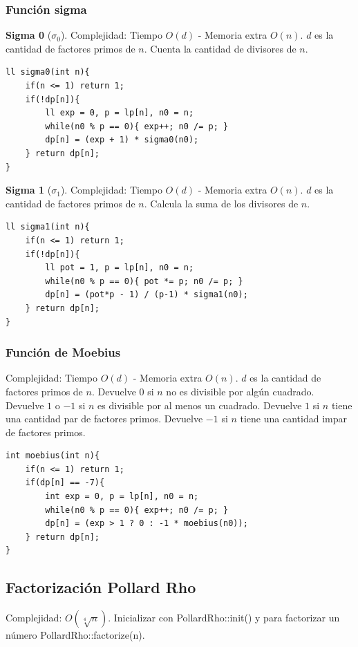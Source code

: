 \documentclass[12 pts,spanish,mexico]{article}
\numberwithin{equation}{section}
\begin{document}
\begin{multicols}{2}
\subsubsection{Función sigma}
\textbf{Sigma 0} ($\sigma_0$). Complejidad: Tiempo $O(d)$ - Memoria extra $O(n)$. $d$ es la cantidad de factores primos de $n$. Cuenta la cantidad de divisores de $n$.
\begin{verbatim}
ll sigma0(int n){
    if(n <= 1) return 1;
    if(!dp[n]){
        ll exp = 0, p = lp[n], n0 = n;
        while(n0 % p == 0){ exp++; n0 /= p; }
        dp[n] = (exp + 1) * sigma0(n0);
    } return dp[n];
}
\end{verbatim}

\textbf{Sigma 1} ($\sigma_1$). Complejidad: Tiempo $O(d)$ - Memoria extra $O(n)$. $d$ es la cantidad de factores primos de $n$. Calcula la suma de los divisores de $n$.
\begin{verbatim}
ll sigma1(int n){
    if(n <= 1) return 1;
    if(!dp[n]){
        ll pot = 1, p = lp[n], n0 = n;
        while(n0 % p == 0){ pot *= p; n0 /= p; }
        dp[n] = (pot*p - 1) / (p-1) * sigma1(n0);
    } return dp[n];
}
\end{verbatim}

\subsubsection{Función de Moebius}
Complejidad: Tiempo $O(d)$ - Memoria extra $O(n)$. $d$ es la cantidad de factores primos de $n$. Devuelve $0$ si $n$ no es divisible por algún cuadrado. Devuelve $1$ o $-1$ si $n$ es divisible por al menos un cuadrado. Devuelve $1$ si $n$ tiene una cantidad par de factores primos. Devuelve $-1$ si $n$ tiene una cantidad impar de factores primos.
\begin{verbatim}
int moebius(int n){
    if(n <= 1) return 1;
    if(dp[n] == -7){
        int exp = 0, p = lp[n], n0 = n;
        while(n0 % p == 0){ exp++; n0 /= p; }
        dp[n] = (exp > 1 ? 0 : -1 * moebius(n0));
    } return dp[n];
}
\end{verbatim}

\subsection{Factorización Pollard Rho}

Complejidad: $O(\sqrt[4]{n})$. Inicializar con PollardRho::init() y para factorizar un número PollardRho::factorize(n).


\end{multicols}
\end{document}
